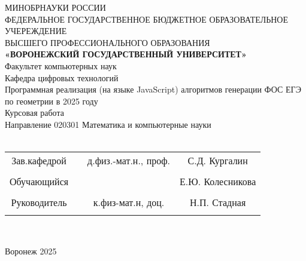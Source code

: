 
\begin{center}
	\hfill \break
	\large{МИНОБРНАУКИ РОССИИ}\\
	\footnotesize{ФЕДЕРАЛЬНОЕ ГОСУДАРСТВЕННОЕ БЮДЖЕТНОЕ ОБРАЗОВАТЕЛЬНОЕ УЧЕРЕЖДЕНИЕ}\\
	\footnotesize{ВЫСШЕГО ПРОФЕССИОНАЛЬНОГО ОБРАЗОВАНИЯ}\\
	\small{\textbf{«ВОРОНЕЖСКИЙ ГОСУДАРСТВЕННЫЙ УНИВЕРСИТЕТ»}}\\
	\hfill \break
	\normalsize{Факультет компьютерных наук}\\
	\hfill \break
	\normalsize{Кафедра цифровых технологий}\\
	\hfill\break
	\hfill \break
	\hfill \break
	\hfill \break
	\large{Программная реализация (на языке JavaScript) алгоритмов генерации ФОС ЕГЭ по геометрии в 2025 году}\\
	\hfill \break
	\hfill \break
	\hfill \break
	\hfill \break
	\hfill \break
	\normalsize{Курсовая работа\\
		\hfill \break
		Направление  020301 Математика и компьютерные науки\\

		\hfill \break
	}\\
	\hfill \break
	\hfill \break
\end{center}
\hfill \break

\normalsize{
	\begin{tabular}{cccc}
		Зав.кафедрой & \underline{\hspace{3cm}} & д.физ.-мат.н.,  проф. & С.Д. Кургалин    \\\\
		Обучающийся  & \underline{\hspace{3cm}} &                       & Е.Ю. Колесникова \\\\
		Руководитель & \underline{\hspace{3cm}} & к.физ-мат.н,      доц. & Н.П. Стадная    \\\\
	\end{tabular}
}\\
\hfill \break
\hfill \break
\begin{center} Воронеж 2025 \end{center}
\thispagestyle{empty} %

